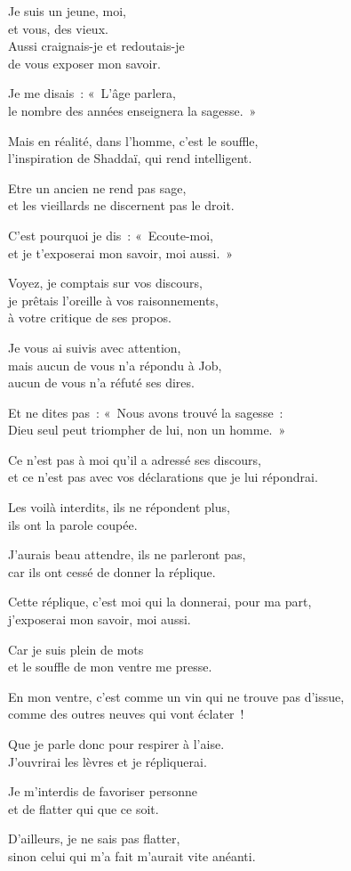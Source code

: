 \documentclass[twoside]{book} %
\newcommand{\lnatt}[1]{\reversemarginpar\marginpar[\sffamily\scriptsize #1]{}}
\newcommand{\lpar}[1]{\noindent\hangindent=2\parindent  #1\par} %
\newcommand\chapterclose{} %
\renewcommand{\lnatt}[1]{\marginpar{\sffamily\scriptsize #1}}
\begin{document}
\lpar{Je suis un jeune, moi, \\
et vous, des vieux. \\
Aussi craignais-je et redoutais-je \\
de vous exposer mon savoir.}
\lpar{Je me disais : « L’âge parlera, \\
le nombre des années enseignera la sagesse. »}
\lpar{Mais en réalité, dans l’homme, c’est le souffle, \\
l’inspiration de Shaddaï, qui rend intelligent.}
\lpar{Etre un ancien ne rend pas sage, \\
et les vieillards ne discernent pas le droit.}
\lpar{\lnatt{10}C’est pourquoi je dis : « Ecoute-moi, \\
et je t’exposerai mon savoir, moi aussi. »}
\bigskip
\lpar{Voyez, je comptais sur vos discours, \\
je prêtais l’oreille à vos raisonnements, \\
à votre critique de ses propos.}
\lpar{Je vous ai suivis avec attention, \\
mais aucun de vous n’a répondu à Job, \\
aucun de vous n’a réfuté ses dires.}
\lpar{Et ne dites pas : « Nous avons trouvé la sagesse : \\
Dieu seul peut triompher de lui, non un homme. »}
\lpar{Ce n’est pas à moi qu’il a adressé ses discours, \\
et ce n’est pas avec vos déclarations que je lui répondrai.}
\bigskip
\lpar{\lnatt{15}Les voilà interdits, ils ne répondent plus, \\
ils ont la parole coupée.}
\lpar{J’aurais beau attendre, ils ne parleront pas, \\
car ils ont cessé de donner la réplique.}
\lpar{Cette réplique, c’est moi qui la donnerai, pour ma part, \\
j’exposerai mon savoir, moi aussi.}
\lpar{Car je suis plein de mots \\
et le souffle de mon ventre me presse.}
\lpar{En mon ventre, c’est comme un vin qui ne trouve pas d’issue, \\
comme des outres neuves qui vont éclater !}
\lpar{\lnatt{20}Que je parle donc pour respirer à l’aise. \\
J’ouvrirai les lèvres et je répliquerai.}
\lpar{Je m’interdis de favoriser personne \\
et de flatter qui que ce soit.}
\lpar{D’ailleurs, je ne sais pas flatter, \\
sinon celui qui m’a fait m’aurait vite anéanti.}
\chapterclose
\end{document}
